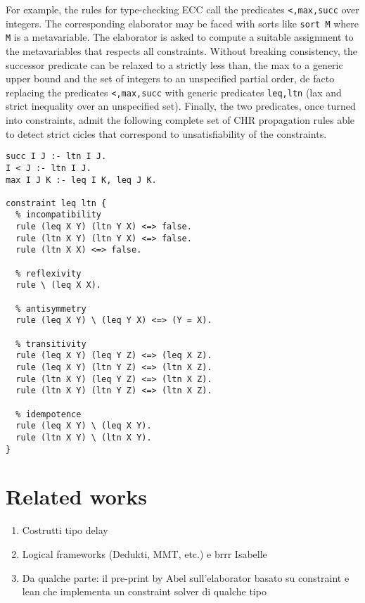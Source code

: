 \documentclass{easychair}
\begin{document}
For example, the rules for type-checking ECC call the predicates \verb+<,max,succ+ over integers. The corresponding elaborator may be faced with sorts like \verb+sort M+ where \verb+M+ is a metavariable. The elaborator is asked to compute a suitable assignment to the metavariables that respects all constraints. Without breaking consistency, the successor predicate can be relaxed to a strictly less than, the max to a generic upper bound and the set of integers to an unspecified partial order, de facto replacing the predicates \verb+<,max,succ+ with generic predicates \verb+leq,ltn+ (lax and strict inequality over an unspecified set). Finally, the two predicates, once turned into constraints, admit the following complete set of CHR propagation rules able to detect strict cicles that correspond to unsatisfiability of the constraints.

\label{chruniverses}
\begin{verbatim}
succ I J :- ltn I J.
I < J :- ltn I J.
max I J K :- leq I K, leq J K.

constraint leq ltn {
  % incompatibility
  rule (leq X Y) (ltn Y X) <=> false.
  rule (ltn X Y) (ltn Y X) <=> false.
  rule (ltn X X) <=> false.
  
  % reflexivity
  rule \ (leq X X).

  % antisymmetry
  rule (leq X Y) \ (leq Y X) <=> (Y = X).

  % transitivity
  rule (leq X Y) (leq Y Z) <=> (leq X Z).
  rule (leq X Y) (ltn Y Z) <=> (ltn X Z).
  rule (ltn X Y) (leq Y Z) <=> (ltn X Z).
  rule (ltn X Y) (ltn Y Z) <=> (ltn X Z).

  % idempotence
  rule (leq X Y) \ (leq X Y).
  rule (ltn X Y) \ (ltn X Y).
}
\end{verbatim}


\section{Related works}
\begin{enumerate}
\item Costrutti tipo delay
\item Logical frameworks (Dedukti, MMT, etc.) e brrr Isabelle
\item Da qualche parte: il pre-print by Abel sull'elaborator basato su
 constraint e lean che implementa un constraint solver di qualche tipo
\end{enumerate}
\end{document}
